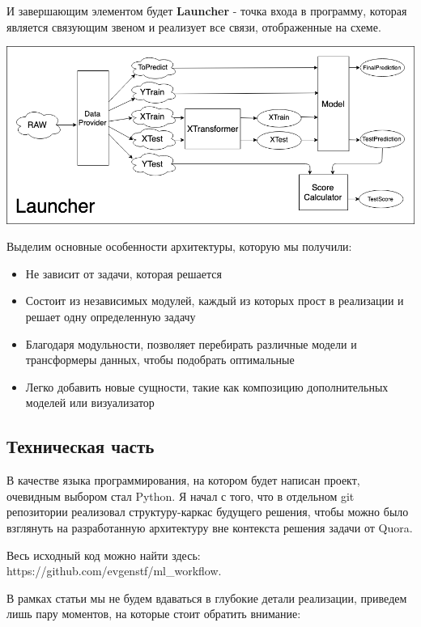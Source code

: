     И завершающим элементом будет \textbf{Launcher} - точка входа в программу, которая является связующим звеном и реализует все связи, отображенные на схеме.
    
    
    \begin{center} \includegraphics[width=450pt]{images/workflow_schema_5}\end{center}
    
    \pagebreak
    Выделим основные особенности архитектуры, которую мы получили:
    
    \begin{itemize}
        \item Не зависит от задачи, которая решается
        \item Состоит из независимых модулей, каждый из которых прост в реализации и решает одну определенную задачу
        \item Благодаря модульности, позволяет перебирать различные модели и трансформеры данных, чтобы подобрать оптимальные
        \item Легко добавить новые сущности, такие как композицию дополнительных моделей или визуализатор
    \end{itemize}
    
    
\pagebreak
\subsection{Техническая часть}
    
    В качестве языка программирования, на котором будет написан проект, очевидным выбором стал Python. Я начал с того, что в отдельном git репозитории реализовал структуру-каркас будущего решения, чтобы можно было взглянуть на разработанную архитектуру вне контекста решения задачи от Quora.
    
    Весь исходный код можно найти здесь: https://github.com/evgenstf/ml\_workflow.
    
    В рамках статьи мы не будем вдаваться в глубокие детали реализации, приведем лишь пару моментов, на которые стоит обратить внимание:
    
